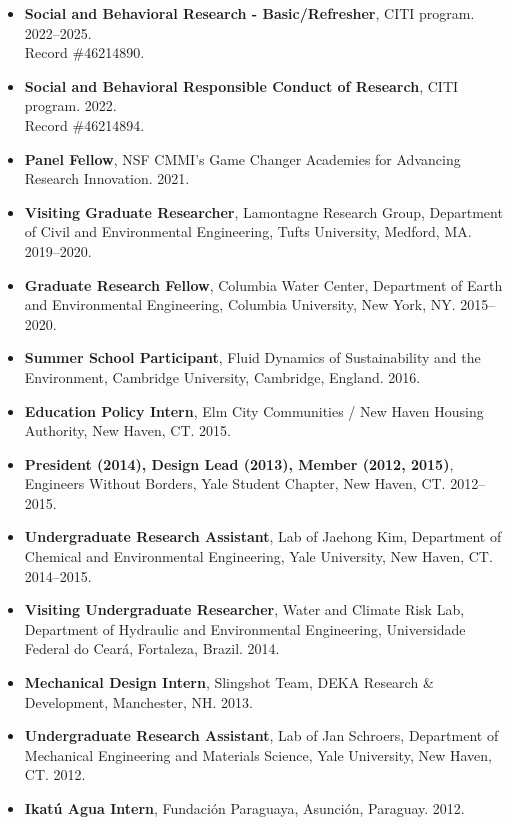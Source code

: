\documentclass[10pt,oneside]{article}
\begin{document}
\begin{itemize}[label={}]
  
  \item \textbf{Social and Behavioral Research - Basic/Refresher}, CITI program. 2022--2025.\\Record \#46214890.
  
  \item \textbf{Social and Behavioral Responsible Conduct of Research}, CITI program. 2022.\\Record \#46214894.
  
  \item \textbf{Panel Fellow}, NSF CMMI's Game Changer Academies for Advancing Research Innovation. 2021.
  
  \item \textbf{Visiting Graduate Researcher}, Lamontagne Research Group, Department of Civil and Environmental Engineering, Tufts University, Medford, MA. 2019--2020.
  
  \item \textbf{Graduate Research Fellow}, Columbia Water Center, Department of Earth and Environmental Engineering, Columbia University, New York, NY. 2015--2020.
  
  \item \textbf{Summer School Participant}, Fluid Dynamics of Sustainability and the Environment, Cambridge University, Cambridge, England. 2016.
  
  \item \textbf{Education Policy Intern}, Elm City Communities / New Haven Housing Authority, New Haven, CT. 2015.
  
  \item \textbf{President (2014), Design Lead (2013), Member (2012, 2015)}, Engineers Without Borders, Yale Student Chapter, New Haven, CT. 2012--2015.
  
  \item \textbf{Undergraduate Research Assistant}, Lab of Jaehong Kim, Department of Chemical and Environmental Engineering, Yale University, New Haven, CT. 2014--2015.
  
  \item \textbf{Visiting Undergraduate Researcher}, Water and Climate Risk Lab, Department of Hydraulic and Environmental Engineering, Universidade Federal do Ceará, Fortaleza, Brazil. 2014.
  
  \item \textbf{Mechanical Design Intern}, Slingshot Team, DEKA Research \& Development, Manchester, NH. 2013.
  
  \item \textbf{Undergraduate Research Assistant}, Lab of Jan Schroers, Department of Mechanical Engineering and Materials Science, Yale University, New Haven, CT. 2012.
  
  \item \textbf{Ikatú Agua Intern}, Fundación Paraguaya, Asunción, Paraguay. 2012.
  
\end{itemize}
\end{document}
